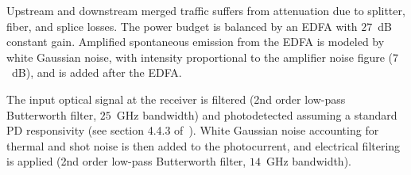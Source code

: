 \documentclass[a4paper,10pt]{report}
\begin{document}
Upstream and downstream merged traffic suffers from attenuation due to
splitter, fiber, and
splice losses. The power budget is balanced by an EDFA with $27$~dB constant gain.
Amplified spontaneous emission from the EDFA is modeled by white Gaussian
noise, with intensity proportional to the amplifier noise figure ($7$~dB), and is added
after the EDFA. 


The input optical signal at the receiver is filtered (2nd order low-pass Butterworth filter, $25$~GHz bandwidth) and photodetected assuming a standard PD responsivity (see section 4.4.3 of~\cite{Agrawal:xx}).
White Gaussian noise accounting for thermal and shot noise is then added
to the photocurrent, and 
electrical filtering is applied (2nd order low-pass Butterworth filter, $14$~GHz bandwidth).
\end{document}
